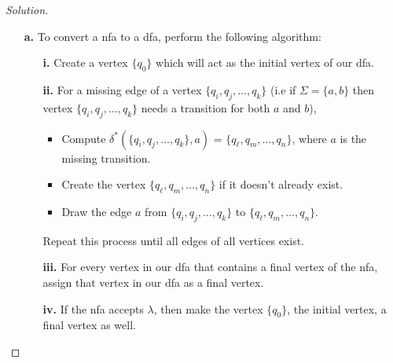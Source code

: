 \documentclass[ 12pt ]{article}
\begin{document}
\begin{enumerate}
		\begin{proof}[Solution]
			\begin{enumerate}
				\item[\textbf{a.}] To convert a nfa to a dfa, perform the following algorithm:
					\begin{enumerate}
						\item[\textbf{i.}] Create a vertex $\{ q_0 \}$ which will act as the initial vertex of our dfa.
						\item[\textbf{ii.}] For a missing edge of a vertex $\{ q_i, q_j, \hdots, q_k \}$ (i.e if $\Sigma = \{ a, b\}$ then vertex $\{ q_i, q_j, \hdots, q_k \}$ needs a
							transition for both $a$ and $b$),
							\begin{itemize}
								\item Compute $\delta^*\left( \{ q_i, q_j, \hdots, q_k \}, a \right)$ = $\{ q_\ell, q_m, \hdots, q_n \}$, where $a$ is the missing transition.
								\item Create the vertex $\{ q_\ell, q_m, \hdots, q_n \}$ if it doesn't already exist.
								\item Draw the edge $a$ from $\{ q_i, q_j, \hdots, q_k \}$ to $\{ q_\ell, q_m, \hdots, q_n \}$.
							\end{itemize}
							Repeat this process until all edges of all vertices exist.
						\item[\textbf{iii.}] For every vertex in our dfa that contains a final vertex of the nfa, assign that vertex in our dfa as a final vertex.
						\item[\textbf{iv.}] If the nfa accepts $\lambda$, then make the vertex $\{ q_0 \}$, the initial vertex, a final vertex as well.
					\end{enumerate}


\end{enumerate}
\end{proof}
\end{enumerate}
\end{document}
